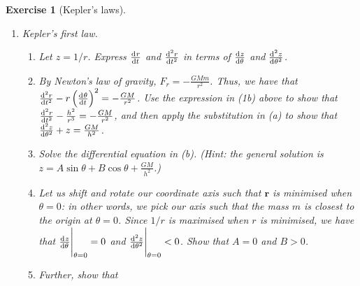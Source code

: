 \documentclass[a4paper,leqno,9pt]{article}
\theoremstyle{exercise}
\newtheorem{Exercise}{Exercise}
\newenvironment{exercise}
  {\begin{mdframed}\begin{Exercise}}
  {\end{Exercise}\end{mdframed}}
\theoremstyle{plain}
\theoremstyle{definition}
\theoremstyle{remark}
\newcommand{\df}{\textbf}
\renewcommand\vec{\mathbf}
\begin{document}
\begin{exercise}[Kepler's laws]
\begin{enumerate}
\begin{enumerate}
              Our force of gravity is a \df{central force}: it only acts in the direction of $ \vec{r} $. Hence the $ \theta$-component
              of the force acting on the mass $ m $ is zero. Show that
              \begin{displaymath}
                r^2 \od{\theta}{t} = h
              \end{displaymath}
              for some constant $ h $.
        \item Suppose $ A(t) $ gives the area `swept out' by the radius vector $ \vec{r} $ between some fixed time $ t_0 $
              and the time $ t $. Using the fact that $ \od{A}{\theta} = \frac{r^2}{2} $ (since $ \dif{A} = \pi r^2 \cdot \frac{\dif{\theta}}{2\pi} $),
              show that $ A(t_2) - A(t_1) = \frac{1}{2}h(t_2 - t_1) $. Conclude \df{Kepler's second law}: if $ P $ and $ Q $ are
              planets with associated masses $ m_P $ and $ m_Q $, then over a time $ \Delta t $ the planets will sweep out equal
              area.
      \end{enumerate}
    \item Kepler's first law.
      \begin{enumerate}
        \item Let $ z = 1/r $. Express $ \od{r}{t} $ and $ \od[2]{r}{t} $ in terms of $ \od{z}{\theta} $ and $ \od[2]{z}{\theta} $.
        \item By Newton's law of gravity, $ F_r = -\frac{GMm}{r^2} $. Thus, we have that $ \od[2]{r}{t} - r \left(\od{\theta}{t}\right)^2 = -\frac{GM}{r^2} $.
              Use the expression in (1b) above to show that $ \od[2]{r}{t} - \frac{h^2}{r^3} = -\frac{GM}{r^2} $, and then apply
              the substitution in (a) to show that $ \od[2]{z}{\theta} + z = \frac{GM}{h^2} $.
        \item Solve the differential equation in (b). (Hint: the general solution is $ z = A \sin \theta + B \cos \theta + \frac{GM}{h^2} $.)
        \item Let us shift and rotate our coordinate axis such that $ \vec{r} $ is minimised when $ \theta = 0 $: in other words, we pick
              our axis such that the mass $ m $ is closest to the origin at $ \theta = 0 $. Since $ 1/r $ is maximised when $ r $ is minimised,
              we have that $ \eval{\od{z}{\theta}}_{\theta = 0} = 0 $ and $ \eval{\od[2]{z}{\theta}}_{\theta = 0} < 0 $. Show that $ A = 0 $
              and $ B > 0 $.
        \item Further, show that
              \begin{displaymath}

\end{displaymath}
\end{enumerate}
\end{enumerate}
\end{exercise}
\end{document}
